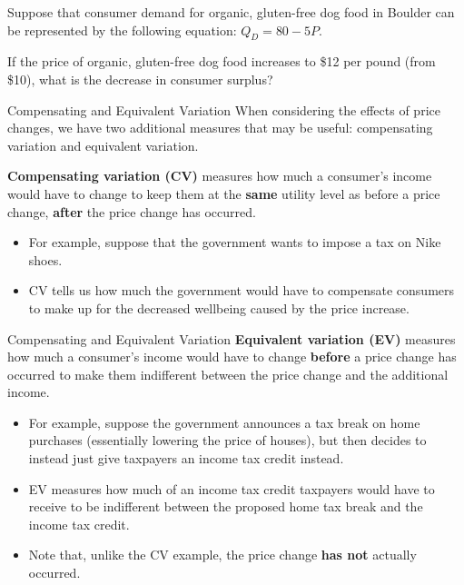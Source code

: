 \documentclass[11pt,t]{beamer}
\begin{document}
\begin{frame}
\end{frame}

\begin{frame}
  
  \bigskip
  Suppose that consumer demand for organic, gluten-free dog food in Boulder can be represented by the following equation: $Q_D = 80 - 5P$. 
  
  \smallskip
  If the price of organic, gluten-free dog food increases to \$12 per pound (from \$10), what is the decrease in consumer surplus?
\end{frame}

\begin{frame}
\end{frame}

\begin{frame}{Compensating and Equivalent Variation}
  When considering the effects of price changes, we have two additional measures that may be useful: compensating variation and equivalent variation.

  \bigskip\pause
  \textbf{Compensating variation (CV)} measures how much a consumer's income would have to change to keep them at the \textbf{same} utility level as before a price change, \textbf{after} the price change has occurred.
  
  \begin{itemize}
    \item For example, suppose that the government wants to impose a tax on Nike shoes.
    
    \item CV tells us how much the government would have to compensate consumers to make up for the decreased wellbeing caused by the price increase.
  \end{itemize}
\end{frame}

\begin{frame}{Compensating and Equivalent Variation}
  \textbf{Equivalent variation (EV)} measures how much a consumer's income would have to change \textbf{before} a price change has occurred to make them indifferent between the price change and the additional income.

  \begin{itemize}
    \item For example, suppose the government announces a tax break on home purchases (essentially lowering the price of houses), but then decides to instead just give taxpayers an income tax credit instead.

    \item EV measures how much of an income tax credit taxpayers would have to receive to be indifferent between the proposed home tax break and the income tax credit.

    \item Note that, unlike the CV example, the price change \textbf{has not} actually occurred.
  \end{itemize}
\end{frame}
\end{document}

